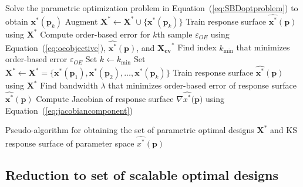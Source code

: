 \begin{algorithm}
	\DontPrintSemicolon %
	 {
		Solve the parametric optimization problem in Equation~(\ref{eq:SBDoptproblem}) to obtain $\mathbf{x}^*(\mathbf{p}_k)$\;
		Augment $\mathbf{X}^* \gets \mathbf{X}^* \cup \{ \mathbf{x}^*(\mathbf{p}_k) \} $\;
		Train response surface $\hat{\mathbf{x}^*}(\mathbf{p})$ using $\mathbf{X}^*$\;
		Compute order-based error for $k$th sample $\varepsilon_{OE}$ using Equation~(\ref{eq:oeobjective}), $\hat{\mathbf{x}^*}(\mathbf{p})$, and $\mathbf{X_{cv}}^*$\;
	}
	Find index $k_{\textrm{min}}$ that minimizes order-based error $\varepsilon_{OE}$\;
	Set $k \gets k_{\textrm{min}} $ \;
	Set $\mathbf{X}^* \gets \mathbf{X}^*= \{ \mathbf{x}^*(\mathbf{p}_1),\mathbf{x}^*(\mathbf{p}_2),\ldots,\mathbf{x}^*(\mathbf{p}_k) \} $ \;
	Train response surface $\hat{\mathbf{x}^*}(\mathbf{p})$ using $\mathbf{X}^*$ \;
	Find bandwidth $\lambda$ that minimizes order-based error of response surface $\hat{\mathbf{x}^*}(\mathbf{p})$\;
	Compute Jacobian of response surface $\nabla\hat{{x}^*}(\mathbf{p)}$ using Equation~(\ref{eq:jacobiancomponent})\;
	\caption{Pseudo-algorithm for obtaining the set of parametric optimal designs $\mathbf{X}^*$ and \ac{KS} response surface of parameter space $\hat{{x}^*}(\mathbf{p})$}
	\label{algo:PODalgo}
\end{algorithm}

\subsection{Reduction to set of scalable optimal designs} \label{subsec:SBDfAM}

